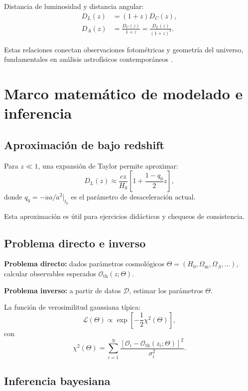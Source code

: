 \documentclass[12pt,oneside]{book}
\newcommand{\OmM}{\Omega_{\mathrm{m}}}
\newcommand{\OmL}{\Omega_{\Lambda}}
\begin{document}
Distancia de luminosidad y distancia angular:
\begin{align}
  D_L(z)&=(1+z)D_C(z),\\
  D_A(z)&=\frac{D_C(z)}{1+z}=\frac{D_L(z)}{(1+z)^2}.
\end{align}

Estas relaciones conectan observaciones fotométricas y geometría del universo,
fundamentales en análisis astrofísicos contemporáneos \citep{hogg1999}.

\chapter{Marco matemático de modelado e inferencia}

\section{Aproximación de bajo redshift}

Para $z\ll1$, una expansión de Taylor permite aproximar:
\begin{equation}
  D_L(z)\approx\frac{cz}{H_0}\left[1+\frac{1-q_0}{2}z\right],
\end{equation}
donde $q_0=-\ddot a a/\dot a^2\vert_{t_0}$ es el parámetro de desaceleración actual.

Esta aproximación es útil para ejercicios didácticos y chequeos de consistencia.

\section{Problema directo e inverso}

\textbf{Problema directo:} dados parámetros cosmológicos $\Theta=(H_0,\OmM,\OmL,\dots)$,
calcular observables esperados $\mathcal{O}_{\text{th}}(z;\Theta)$.

\textbf{Problema inverso:} a partir de datos $\mathcal{D}$, estimar los parámetros $\Theta$.

La función de verosimilitud gaussiana típica:
\begin{equation}
  \mathcal{L}(\Theta)\propto \exp\left[-\frac{1}{2}\chi^2(\Theta)\right],
\end{equation}
con
\begin{equation}
  \chi^2(\Theta)=\sum_{i=1}^{N}\frac{\left[\mathcal{O}_i-\mathcal{O}_{\text{th}}(z_i;\Theta)\right]^2}{\sigma_i^2}.
\end{equation}

\section{Inferencia bayesiana}
\end{document}

